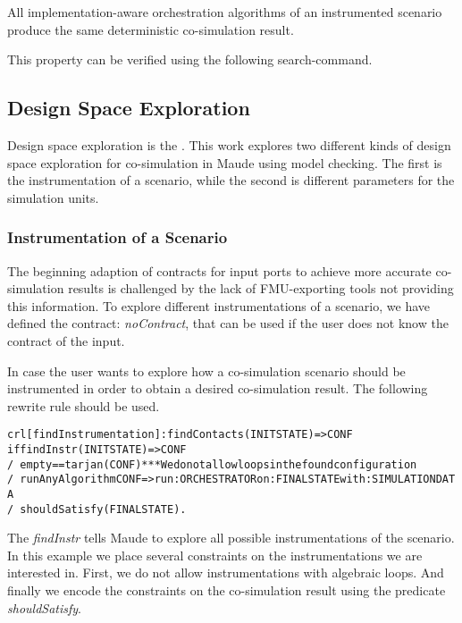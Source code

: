 \begin{lemma}
    All implementation-aware orchestration algorithms of an instrumented scenario produce the same deterministic co-simulation result.
\end{lemma}

This property can be verified using the following search-command.






\subsection{Design Space Exploration}
Design space exploration is the .
This work explores two different kinds of design space exploration for co-simulation in Maude using model checking.
The first is the instrumentation of a scenario, while the second is different parameters for the simulation units.  

\subsubsection{Instrumentation of a Scenario}
The beginning adaption of contracts for input ports to achieve more accurate co-simulation results is challenged by the lack of FMU-exporting tools not providing this information. 
To explore different instrumentations of a scenario, we have defined the contract: \textit{noContract}, that can be used if the user does not know the contract of the input.

In case the user wants to explore how a co-simulation scenario should be instrumented in order to obtain a desired co-simulation result.
The following rewrite rule should be used. 
\begin{alltt}
crl [findInstrumentation]: findContacts(INITSTATE) => CONF
    if findInstr(INITSTATE) => CONF
    /\ empty == tarjan(CONF) *** We do not allow loops in the found configuration
    /\ runAnyAlgorithm CONF => run: ORCHESTRATOR on: FINALSTATE with: SIMULATIONDATA
    /\ shouldSatisfy(FINALSTATE) .
\end{alltt}

The \emph{findInstr} tells Maude to explore all possible instrumentations of the scenario. 
In this example we place several constraints on the instrumentations we are interested in.
First, we do not allow instrumentations with algebraic loops. 
And finally we encode the constraints on the co-simulation result using the predicate \textit{shouldSatisfy}.

